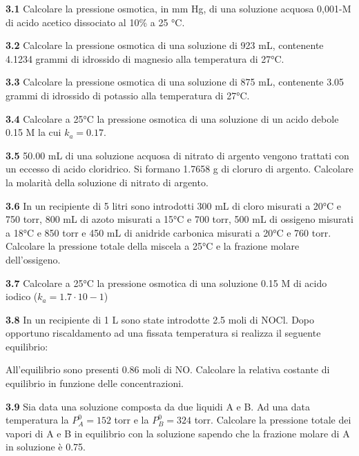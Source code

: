 \textbf{3.1} Calcolare la pressione osmotica, in mm Hg, di una soluzione acquosa 0,001-M di acido acetico dissociato al 10\% a 25 °C.

\vspace{0.2cm}\textbf{3.2} Calcolare la pressione osmotica di una soluzione di 923 mL, contenente 4.1234 grammi di idrossido di magnesio alla temperatura di 27°C. 

\vspace{0.2cm}\textbf{3.3} Calcolare la pressione osmotica di una soluzione di 875 mL, contenente 3.05 grammi di idrossido
di potassio alla temperatura di 27°C.

\vspace{0.2cm}\textbf{3.4} Calcolare a 25°C la pressione osmotica di una soluzione di un acido debole 0.15 M la cui $k_a=0.17$.

\vspace{0.2cm}\textbf{3.5} 50.00 mL di una soluzione acquosa di nitrato di argento vengono trattati con un eccesso di acido
cloridrico. Si formano 1.7658 g di cloruro di argento. Calcolare la molarità della soluzione di nitrato
di argento.

\vspace{0.2cm}\textbf{3.6} In un recipiente di 5 litri sono introdotti 300 mL di cloro misurati a 20°C e 750 torr, 800 mL di azoto misurati a 15°C e 700 torr, 500 mL di ossigeno misurati a 18°C e 850 torr e 450 mL di anidride carbonica misurati a 20°C e 760 torr. Calcolare la pressione totale della miscela a 25°C e la frazione molare dell’ossigeno.

\vspace{0.2cm}\textbf{3.7} Calcolare a 25°C la pressione osmotica di una soluzione 0.15 M di acido iodico ($k_a= 1.7 \cdot 10-1 $)

\vspace{0.2cm}\textbf{3.8} In un recipiente di 1 L sono state introdotte 2.5 moli di NOCl. Dopo opportuno riscaldamento ad una fissata temperatura si realizza il seguente equilibrio:

\begin{center}
\end{center}

All’equilibrio sono presenti 0.86 moli di NO. Calcolare la relativa costante di equilibrio in funzione delle concentrazioni.

\vspace{0.2cm}\textbf{3.9} Sia data una soluzione composta da due liquidi A e B. Ad una data temperatura la $P^0_A = 152$ torr
e la $P^0_B = 324$ torr. Calcolare la pressione totale dei vapori di A e B in equilibrio con la soluzione sapendo che la frazione molare di A in soluzione è 0.75.

